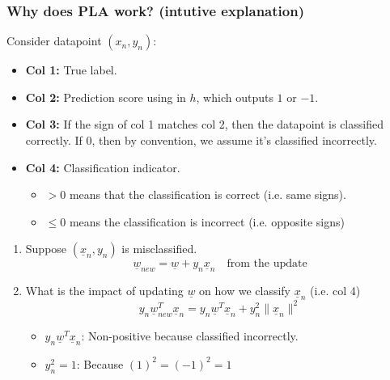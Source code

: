     \subsubsection{Why does PLA work? (intutive explanation)}
    \begin{intuition}
        Consider datapoint $(x_n,y_n)$:
        \begin{itemize}
            \item \textbf{Col 1:} True label.
            \item \textbf{Col 2:} Prediction score using in $h$, which outputs $1$ or $-1$.
            \item \textbf{Col 3:} If the sign of col 1 matches col 2, then the datapoint is classified correctly. If $0$, then by convention, we assume it's classified incorrectly.
            \item \textbf{Col 4:} Classification indicator.
            \begin{itemize}
                \item $>0$ means that the classification is correct (i.e. same signs). 
                \item $\leq 0$ means the classification is incorrect (i.e. opposite signs)
            \end{itemize}
        \end{itemize}
        \vspace{1em}
        \begin{enumerate}
            \item Suppose $(\underline{x}_n,y_n)$ is misclassified.
            \begin{equation*}
                \underline{w}_{new} = \underline{w} + y_n \underline{x}_n \quad \text{from the update}             
            \end{equation*}
            \item What is the impact of updating $\underline{w}$ on how we classify $\underline{x}_n$ (i.e. col 4)
            \begin{equation*}
                y_n \underline{w}_{new}^T \underline{x}_n = y_n \underline{w}^T \underline{x}_n + y_n^2 \lVert \underline{x}_n \rVert^2
            \end{equation*}
            \begin{itemize}
                \item $y_n \underline{w}^T \underline{x}_n$: Non-positive because classified incorrectly.
                \item $y_n^2=1$: Because $(1)^2=(-1)^2=1$

\end{itemize}
\end{enumerate}
\end{intuition}
